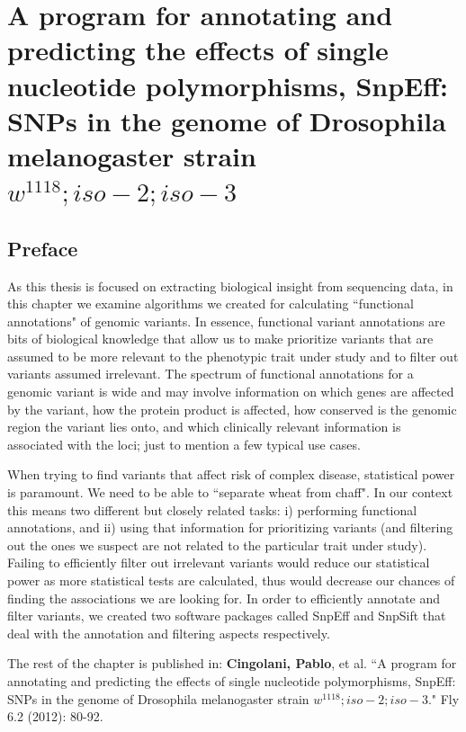 
\chapter{A program for annotating and predicting the
effects of single nucleotide polymorphisms,
SnpEff: SNPs in the genome of Drosophila
melanogaster strain $w^{1118} ; iso-2; iso-3$\label{ch:snpeff}}

\section{Preface}

As this thesis is focused on extracting biological insight from sequencing data, in this chapter we examine algorithms we created for calculating ``functional annotations" of genomic variants. In essence, functional variant annotations are bits of biological knowledge that allow us to make prioritize variants that are assumed to be more relevant to the phenotypic trait under study and to filter out variants assumed irrelevant. The spectrum of functional annotations for a genomic variant is wide and may involve information on which genes are affected by the variant, how the protein product is affected, how conserved is the genomic region the variant lies onto, and which clinically relevant information is associated with the loci; just to mention a few typical use cases.

When trying to find variants that affect risk of complex disease, statistical power is paramount. We need to be able to ``separate wheat from chaff". In our context this means two different but closely related tasks: i) performing functional annotations, and ii) using that information for prioritizing variants (and filtering out the ones we suspect are not related to the particular trait under study). Failing to efficiently filter out irrelevant variants would reduce our statistical power as more statistical tests are calculated, thus would decrease our chances of finding the associations we are looking for. In order to efficiently annotate and filter variants, we created two software packages called SnpEff and SnpSift that deal with the annotation and filtering aspects respectively.

The rest of the chapter is published in: \textbf{Cingolani, Pablo}, et al. ``A program for annotating and predicting the effects of single nucleotide polymorphisms, SnpEff: SNPs in the genome of Drosophila melanogaster strain $w^1118; iso-2; iso-3$." Fly 6.2 (2012): 80-92.


